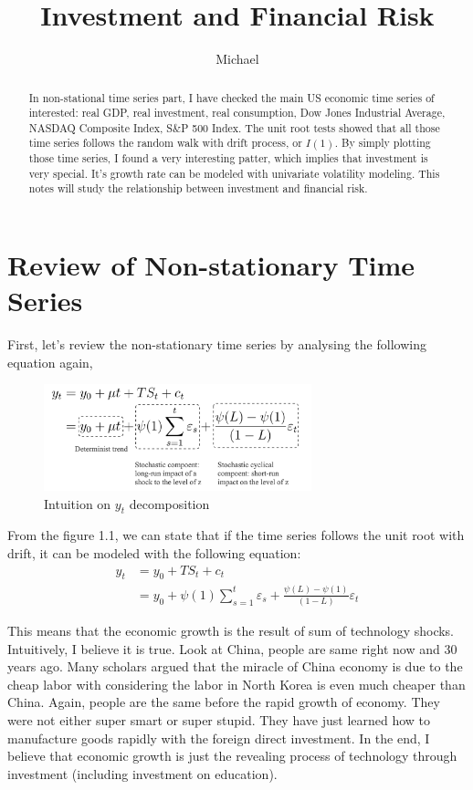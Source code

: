 \documentclass[12pt]{article}
\theoremstyle{definition}
\numberwithin{equation}{section}
\numberwithin{figure}{section}
\numberwithin{table}{section}
\begin{document}
\title{Investment and Financial Risk}
\author{Michael}
\date{}
\maketitle

\begin{abstract}
  In non-stational time series part, I have checked the main US economic time series of interested: real GDP, real investment, real consumption, Dow Jones Industrial Average,
NASDAQ Composite Index, S\&P 500 Index. The unit root tests showed that all those time series follows the random walk with drift process, or $I(1)$. By simply plotting those time series, I found a very interesting patter, which implies that investment is very special. It's growth rate can be modeled with univariate volatility modeling. This notes will study the relationship between investment and financial risk.
\end{abstract}


\section{Review of Non-stationary Time Series}

First, let's review the non-stationary time series by analysing the following equation again,
\begin{figure}[H]
  \centering
  \includegraphics[width=0.69\textwidth]{ydecom}
  \caption{Intuition on $y_t$ decomposition}
\end{figure}

From the figure 1.1, we can state that if the time series follows the unit root with drift, it can be modeled with the following equation:
\begin{align}
  y_t  &  = y_0 + TS_t + c_t \\
  & = y_0 + \psi(1) \sum_{s=1}^t \varepsilon_s + \frac{\psi(L) - \psi(1)}{(1- L)} \varepsilon_t
\end{align}

This means that the economic growth is the result of sum of technology shocks. Intuitively, I believe it is true. Look at China, people are same right now and 30 years ago. Many scholars argued that the miracle of China economy is due to the cheap labor with considering the labor in North Korea is even much cheaper than China. Again, people are the same before the rapid growth of economy. They were not either super smart or super stupid. They have just learned how to manufacture goods rapidly with the foreign direct investment. In the end, I believe that economic growth is just the revealing process of technology through investment (including investment on education).
\end{document}

